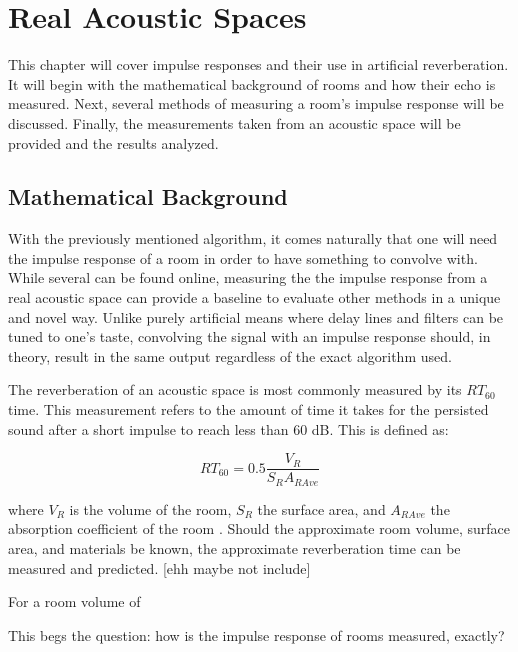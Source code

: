 \chapter{Real Acoustic Spaces}
\hspace*{-0.15cm}This chapter will cover impulse responses and their use in artificial reverberation. It will begin with the mathematical background of rooms and how their echo is measured. Next, several methods of measuring a room's impulse response will be discussed. Finally, the measurements taken from an acoustic space will be provided and the results analyzed.

\section{Mathematical Background}
With the previously mentioned algorithm, it comes naturally that one will need the impulse response of a room in order to have something to convolve with. While several can be found online, measuring the the impulse response from a real acoustic space can provide a baseline to evaluate other methods in a unique and novel way. Unlike purely artificial means where delay lines and filters can be tuned to one's taste, convolving the signal with an impulse response should, in theory, result in the same output regardless of the exact algorithm used.

The reverberation of an acoustic space is most commonly measured by its $RT_{60}$ time. This measurement refers to the amount of time it takes for the persisted sound after a short impulse to reach less than 60 dB. This is defined as:

\begin{defn}\label{def-complex}
	\begin{equation}\label{reverbtime-complex)}
	RT_{60} = 0.5 \frac{V_R}{S_R A_{R Ave}}
\end{equation}\end{defn}

where $V_R$ is the volume of the room, $S_R$ the surface area, and $A_{R Ave}$ the absorption coefficient of the room \cite{pirkle2019designing}. Should the approximate room volume, surface area, and materials be known, the approximate reverberation time can be measured and predicted. [ehh maybe not include]

For a room volume of

This begs the question: how is the impulse response of rooms measured, exactly?

